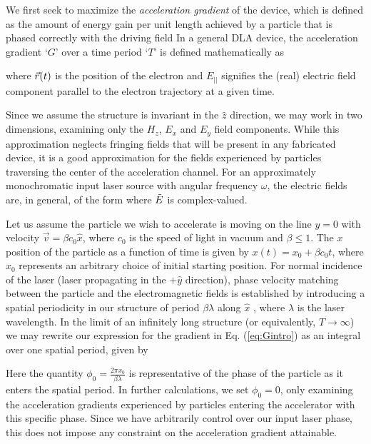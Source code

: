 We first seek to maximize the \textit{acceleration gradient} of the device, which is defined as the amount of energy gain per unit length achieved by a particle that is phased correctly with the driving field
In a general DLA device, the acceleration gradient `$G$' over a time period `$T$' is defined mathematically as

%
where $\vec{r}(t)$ is the position of the electron and $E_{||}$ signifies the (real) electric field component parallel to the electron trajectory at a given time.

Since we assume the structure is invariant in the $\hat{z}$ direction, we may work in two dimensions, examining only the $H_z$, $E_x$ and $E_y$ field components.
While this approximation neglects fringing fields that will be present in any fabricated device, it is a good approximation for the fields experienced by particles traversing the center of the acceleration channel.
For an approximately monochromatic input laser source with angular frequency $\omega$, the electric fields are, in general, of the form
%
where $\tilde{E}$ is complex-valued.

Let us assume the particle we wish to accelerate is moving on the line $y=0$ with velocity $\vec{v} = \beta c_0 \hat{x}$, where $c_0$ is the speed of light in vacuum and $\beta \leq 1$.
The $x$ position of the particle as a function of time is given by $x(t) = x_0 + \beta c_0 t$, where $x_0$ represents an arbitrary choice of initial starting position.
For normal incidence of the laser (laser propagating in the $+\hat{y}$ direction), phase velocity matching between the particle and the electromagnetic fields is established by introducing a spatial periodicity in our structure of period $\beta \lambda$ along $\hat{x}$ , where $\lambda$ is the laser wavelength.
In the limit of an infinitely long structure (or equivalently, $T \to \infty $) we may rewrite our expression for the gradient in Eq. (\ref{eq:Gintro}) as an integral over one spatial period, given by

%
Here the quantity $\phi_0 = \frac{2\pi x_0}{\beta\lambda}$ is representative of the phase of the particle as it enters the spatial period.
In further calculations, we set $\phi_0 = 0$, only examining the acceleration gradients experienced by particles entering the accelerator with this specific phase.
Since we have arbitrarily control over our input laser phase, this does not impose any constraint on the acceleration gradient attainable.

